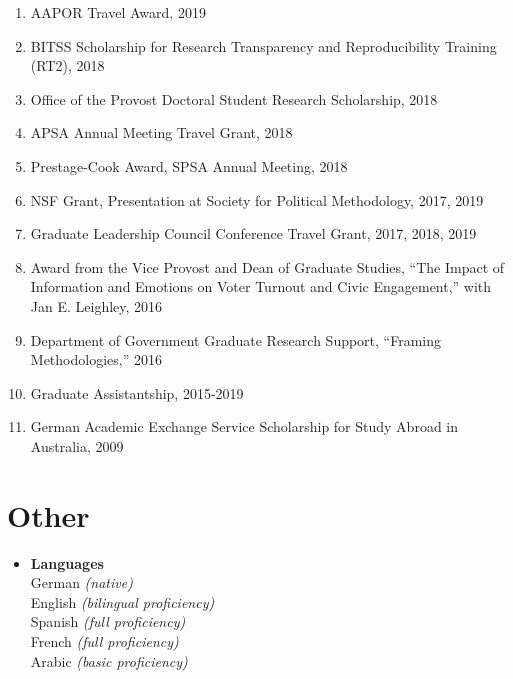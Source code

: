\documentclass[11pt]{article}
\begin{document}
\begin{flushleft}
\begin{enumerate}[leftmargin=!,labelindent=20pt,itemindent=-20pt]
\item[] AAPOR Travel Award, 2019
\vspace{-0.27cm}
\item[] BITSS Scholarship for Research Transparency and Reproducibility Training (RT2), 2018 
\vspace{-0.27cm}
\item[] Office of the Provost Doctoral Student Research Scholarship, 2018
\vspace{-0.27cm}
\item[] APSA Annual Meeting Travel Grant, 2018
\vspace{-0.27cm}
\item[] Prestage-Cook Award, SPSA Annual Meeting, 2018
\vspace{-0.27cm}
\item[] NSF Grant, Presentation at Society for Political Methodology, 2017, 2019
\vspace{-0.27cm}
\item[] Graduate Leadership Council Conference Travel Grant, 2017, 2018, 2019
\vspace{-0.27cm}
\item[] Award from the Vice Provost and Dean of Graduate Studies, ``The Impact of Information and Emotions on Voter Turnout and Civic Engagement,'' with Jan E. Leighley, 2016
\vspace{-0.27cm}
\item[] Department of Government Graduate Research Support, ``Framing Methodologies,'' 2016
\vspace{-0.27cm}
\item[] Graduate Assistantship, 2015-2019
\vspace{-0.27cm}
\item [] German Academic Exchange Service Scholarship for Study Abroad in Australia, 2009
\end{enumerate}




\section*{Other}

\begin{itemize}
\item[] \textbf{Languages}\\
German \textit{(native)} \\
English \textit{(bilingual proficiency)} \\
Spanish \textit{(full proficiency)} \\
French \textit{(full proficiency)} \\
Arabic \textit{(basic proficiency)} \\
\end{itemize}



\pagestyle{myheadings}

\end{flushleft}
 
\end{document}
